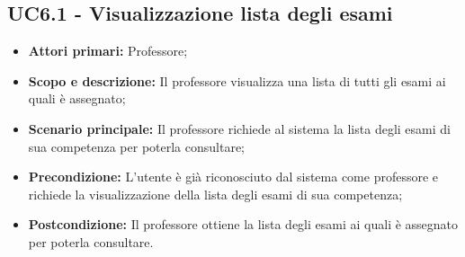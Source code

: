 \documentclass[AnalisiDeiRequisiti.tex]{subfiles}
\begin{document}
\subsection{UC6.1 - Visualizzazione lista degli esami}
\begin{itemize}
	\item \textbf{Attori primari:} Professore;\\
	\item \textbf{Scopo e descrizione:} Il professore visualizza una lista di tutti gli esami ai quali è assegnato;\\
	\item \textbf{Scenario principale:} Il professore richiede al sistema la lista degli esami di sua competenza per poterla consultare;\\
	\item \textbf{Precondizione:} L'utente è già riconosciuto dal sistema come professore e richiede la visualizzazione della lista degli esami di sua competenza;\\
	\item \textbf{Postcondizione:} Il professore ottiene la lista degli esami ai quali è assegnato per poterla consultare.\\
\end{itemize}
\end{document}
